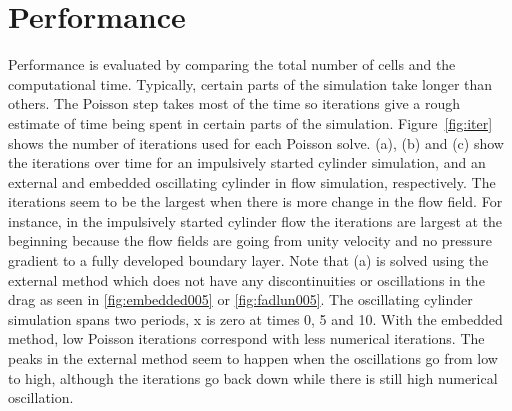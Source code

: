 \section{Performance}
Performance is evaluated by comparing the total number of cells and the computational time. 
Typically, certain parts of the simulation take longer than others. 
The Poisson step takes most of the time so iterations give a rough estimate of  time being spent in certain parts of the simulation. 
Figure~\ref{fig:iter} shows the number of iterations used for each Poisson solve. 
(a), (b) and (c) show the iterations over time for an impulsively started cylinder simulation, and an external and embedded oscillating cylinder in flow simulation, respectively. 
The iterations seem to be the largest when there is more change in the flow field. 
For instance, in the impulsively started cylinder flow the iterations are  largest at the beginning because the flow fields are going from unity velocity and no pressure gradient to a fully developed boundary layer. 
Note that (a) is solved using the external method which does not have any discontinuities or oscillations in the drag as seen in \ref{fig:embedded005} or \ref{fig:fadlun005}. 
The oscillating cylinder simulation spans two periods, x is zero at times 0, 5 and 10. 
With the embedded method, low Poisson iterations correspond with less numerical iterations. 
The peaks in the external method seem to happen when the oscillations go from low to high, although the iterations go back down while there is still high numerical oscillation. 

